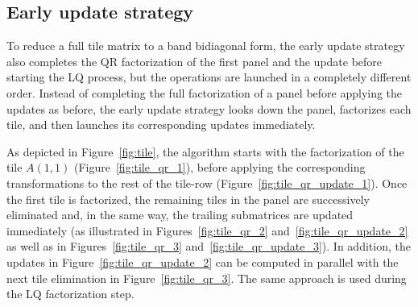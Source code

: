 \subsection{Early update strategy}
To reduce a full tile matrix to a band bidiagonal form,
the early update strategy also completes the QR factorization
of the first panel and the update before starting the LQ process,
but the operations are launched in a completely different order.
Instead of completing the full factorization of a panel
before applying the updates as before,
the early update strategy looks down the panel,
factorizes each tile, and then launches
its corresponding updates immediately.

As depicted in Figure~\ref{fig:tile}, the algorithm starts with the
factorization of the tile $A(1,1)$ (Figure~\ref{fig:tile_qr_1}),
before applying the corresponding transformations to the rest of the
tile-row (Figure~\ref{fig:tile_qr_update_1}).
Once the first tile is factorized,
the remaining tiles in the panel are successively eliminated
and, in the same way, the trailing submatrices are updated immediately
(as illustrated in Figures~\ref{fig:tile_qr_2}
and~\ref{fig:tile_qr_update_2}
as well as in Figures~\ref{fig:tile_qr_3}
and~\ref{fig:tile_qr_update_3}).
In addition,
the updates in Figure~\ref{fig:tile_qr_update_2} can be computed in parallel
with the next tile elimination in Figure~\ref{fig:tile_qr_3}.
The same approach is used during the LQ factorization step.

